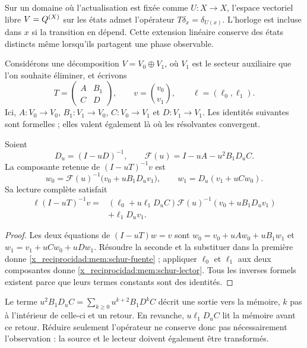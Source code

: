 Sur un domaine où l'actualisation est fixée comme \(U:X\to X\),
l'espace vectoriel libre \(V=Q^{(X)}\) sur les états admet l'opérateur
\(T\delta_x=\delta_{U(x)}\). L'horloge est incluse dans \(x\) si la
transition en dépend. Cette extension linéaire conserve des états
distincts même lorsqu'ils partagent une phase observable.

Considérons une décomposition \(V=V_0\oplus V_1\), où \(V_1\)
est le secteur auxiliaire que l'on souhaite éliminer, et écrivons
\[
 T=\begin{pmatrix}A&B_1\\C&D\end{pmatrix},\qquad
 v=\binom{v_0}{v_1},\qquad \ell=(\ell_0,\ell_1).
\]
Ici, \(A:V_0\to V_0\), \(B_1:V_1\to V_0\),
\(C:V_0\to V_1\) et \(D:V_1\to V_1\).
Les identités suivantes sont formelles ; elles valent également là où les
résolvantes convergent.

\begin{proposition}
\label{x_reciprocidad:mem:prop-schur}
Soient
\[
 D_u=(I-uD)^{-1},\qquad
 \mathscr F(u)=I-uA-u^2B_1D_uC.
\]
La composante retenue de \((I-uT)^{-1}v\) est
\begin{equation}
 w_0=\mathscr F(u)^{-1}\bigl(v_0+uB_1D_uv_1\bigr),
 \qquad w_1=D_u(v_1+uCw_0).
 \label{x_reciprocidad:mem:schur-fuente}
\end{equation}
Sa lecture complète satisfait
\begin{equation}
 \begin{split}
 \ell(I-uT)^{-1}v
 ={}&(\ell_0+u\ell_1D_uC)
       \mathscr F(u)^{-1}(v_0+uB_1D_uv_1)\\
    &+\ell_1D_uv_1.
 \end{split}
 \label{x_reciprocidad:mem:schur-lector}
\end{equation}
\end{proposition}
\begin{proof}
Les deux équations de \((I-uT)w=v\) sont
\(w_0=v_0+uAw_0+uB_1w_1\) et
\(w_1=v_1+uCw_0+uDw_1\).
Résoudre la seconde et la substituer dans la première donne
\eqref{x_reciprocidad:mem:schur-fuente} ; appliquer \(\ell_0\) et \(\ell_1\)
aux deux composantes donne \eqref{x_reciprocidad:mem:schur-lector}.
Tous les inverses formels existent parce que leurs termes constants
sont des identités.
\end{proof}

Le terme \(u^2B_1D_uC=\sum_{k\geq0}u^{k+2}B_1D^kC\)
décrit une sortie vers la mémoire, \(k\) pas à l'intérieur de celle-ci et
un retour. En revanche, \(u\ell_1D_uC\) lit la mémoire avant ce
retour. Réduire seulement l'opérateur ne conserve donc pas nécessairement
l'observation : la source et le lecteur doivent également être transformés.

